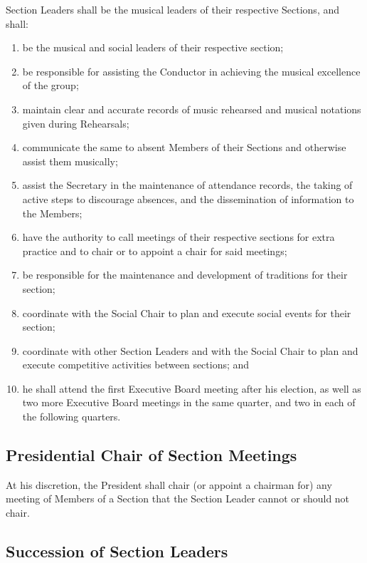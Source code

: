 \documentclass{article}
\begin{document}
Section Leaders shall be the musical leaders of their respective Sections,
and shall:
\begin{enumerate}
\item be the musical and social leaders of their respective section;
\item be responsible for assisting the Conductor in achieving the musical
excellence of the group;
\item maintain clear and accurate records of music rehearsed and musical
notations given during Rehearsals;
\item communicate the same to absent Members of their Sections and otherwise
assist them musically;
\item assist the Secretary in the maintenance of attendance records, the
taking of active steps to discourage absences, and the dissemination
of information to the Members;
\item have the authority to call meetings of their respective sections for
extra practice and to chair or to appoint a chair for said meetings;
\item be responsible for the maintenance and development of traditions for
their section;
\item coordinate with the Social Chair to plan and execute social events
for their section;
\item coordinate with other Section Leaders and with the Social Chair to
plan and execute competitive activities between sections; and
\item he shall attend the first Executive Board meeting after his election,
as well as two more Executive Board meetings in the same quarter,
and two in each of the following quarters.
\end{enumerate}

\subsection{Presidential Chair of Section Meetings}

At his discretion, the President shall chair (or appoint a chairman
for) any meeting of Members of a Section that the Section Leader cannot
or should not chair.

\subsection{Succession of Section Leaders}
\end{document}
